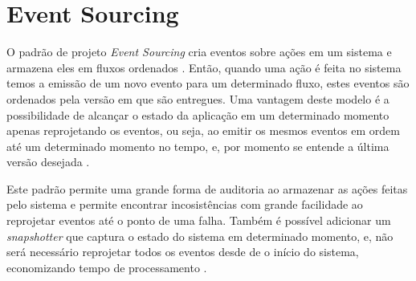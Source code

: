 \section{Event Sourcing}

O padrão de projeto \textit{Event Sourcing} cria eventos sobre ações em um
sistema e armazena eles em fluxos ordenados \cite{event-sourcing}. Então,
quando uma ação é feita no sistema temos a emissão de um novo evento para
um determinado fluxo, estes eventos são ordenados pela versão em que são
entregues. Uma vantagem deste modelo é a possibilidade de alcançar o estado
da aplicação em um determinado momento apenas reprojetando os eventos, ou
seja, ao emitir os mesmos eventos em ordem até um determinado momento no
tempo, e, por momento se entende a última versão desejada
\cite{event-sourcing}.

Este padrão permite uma grande forma de auditoria ao armazenar as ações
feitas pelo sistema e permite encontrar incosistências com grande facilidade
ao reprojetar eventos até o ponto de uma falha. Também é possível adicionar
um \textit{snapshotter} que captura o estado do sistema em determinado
momento, e, não será necessário reprojetar todos os eventos desde de o início
do sistema, economizando tempo de processamento \cite{event-sourcing}.
